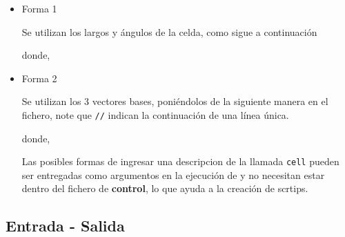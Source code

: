 \begin{itemize} 
\item{Forma 1}

Se utilizan los largos y \'angulos de la celda, como sigue a continuaci\'on


donde,


\item{Forma 2}

Se utilizan los 3 vectores bases, poni\'endolos de la siguiente manera en el fichero, note que \verb|//| indican la continuaci\'on de una l\'inea \'unica.

donde,

Las posibles formas de ingresar una descripcion de la llamada \verb|cell| pueden ser entregadas como argumentos en la ejecuci\'on de \lpmd y no necesitan estar dentro del fichero de \textbf{control}, lo que ayuda a la creaci\'on de scrtips.


\end{itemize}

\subsection{Entrada - Salida}

